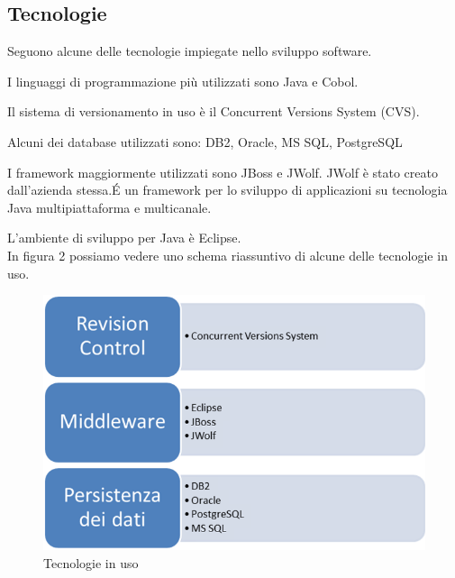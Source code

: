 \subsection{Tecnologie}
\label{1.3}
Seguono alcune delle tecnologie impiegate nello sviluppo software.

I linguaggi di programmazione più utilizzati sono Java e Cobol.

Il sistema di versionamento in uso è il Concurrent Versions System (CVS).

Alcuni dei database utilizzati sono: DB2, Oracle, MS SQL, PostgreSQL

I framework maggiormente utilizzati sono JBoss e JWolf. JWolf è stato creato dall'azienda stessa.\'{E} un framework per lo sviluppo di applicazioni su tecnologia Java multipiattaforma e multicanale.

L'ambiente di sviluppo per Java è Eclipse.\\

In figura 2 possiamo vedere uno schema riassuntivo di alcune delle tecnologie in uso.
\begin{figure}[h!]
\centering
\includegraphics[scale=0.55]{../Logo&Header/tecnologieUsate.png}
\caption{Tecnologie in uso}
\end{figure}


